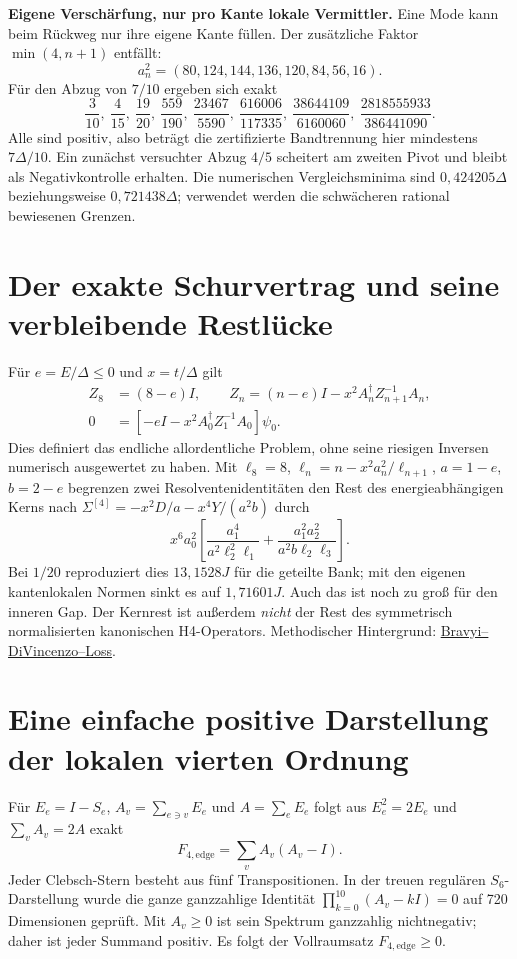 \textbf{Eigene Verschärfung, nur pro Kante lokale Vermittler.} Eine Mode kann beim Rückweg nur ihre eigene Kante füllen. Der zusätzliche Faktor $\min(4,n+1)$ entfällt:
\begin{equation}
a_n^2=(80,124,144,136,120,84,56,16).
\end{equation}
Für den Abzug von $7/10$ ergeben sich exakt
\begin{equation}
\frac3{10},\ \frac4{15},\ \frac{19}{20},\ \frac{559}{190},\
\frac{23467}{5590},\ \frac{616006}{117335},\
\frac{38644109}{6160060},\ \frac{2818555933}{386441090}.
\end{equation}
Alle sind positiv, also beträgt die zertifizierte Bandtrennung hier mindestens $7\Delta/10$. Ein zunächst versuchter Abzug $4/5$ scheitert am zweiten Pivot und bleibt als Negativkontrolle erhalten. Die numerischen Vergleichsminima sind $0{,}424205\Delta$ beziehungsweise $0{,}721438\Delta$; verwendet werden die schwächeren rational bewiesenen Grenzen.

\section{Der exakte Schurvertrag und seine verbleibende Restlücke}
Für $e=E/\Delta\le0$ und $x=t/\Delta$ gilt
\begin{align}
Z_8&=(8-e)I,\qquad Z_n=(n-e)I-x^2A_n^\dagger Z_{n+1}^{-1}A_n,\\
0&=\left[-eI-x^2A_0^\dagger Z_1^{-1}A_0\right]\psi_0.
\end{align}
Dies definiert das endliche allordentliche Problem, ohne seine riesigen Inversen numerisch ausgewertet zu haben. Mit $\ell_8=8$, $\ell_n=n-x^2a_n^2/\ell_{n+1}$, $a=1-e$, $b=2-e$ begrenzen zwei Resolventenidentitäten den Rest des energieabhängigen Kerns nach
$\Sigma^{[4]}=-x^2D/a-x^4Y/(a^2b)$ durch
\begin{equation}
x^6a_0^2\left[\frac{a_1^4}{a^2\ell_2^2\ell_1}
+\frac{a_1^2a_2^2}{a^2b\ell_2\ell_3}\right].
\end{equation}
Bei $1/20$ reproduziert dies $13{,}1528J$ für die geteilte Bank; mit den eigenen kantenlokalen Normen sinkt es auf $1{,}71601J$. Auch das ist noch zu groß für den inneren Gap. Der Kernrest ist außerdem \emph{nicht} der Rest des symmetrisch normalisierten kanonischen H4-Operators. Methodischer Hintergrund: \href{https://arxiv.org/abs/1105.0675}{Bravyi--DiVincenzo--Loss}.

\section{Eine einfache positive Darstellung der lokalen vierten Ordnung}
Für $E_e=I-S_e$, $A_v=\sum_{e\ni v}E_e$ und $A=\sum_eE_e$ folgt aus $E_e^2=2E_e$ und $\sum_vA_v=2A$ exakt
\begin{equation}\boxed{
F_{4,\mathrm{edge}}=\sum_v A_v(A_v-I).}
\end{equation}
Jeder Clebsch-Stern besteht aus fünf Transpositionen. In der treuen regulären $S_6$-Darstellung wurde die ganze ganzzahlige Identität $\prod_{k=0}^{10}(A_v-kI)=0$ auf 720 Dimensionen geprüft. Mit $A_v\ge0$ ist sein Spektrum ganzzahlig nichtnegativ; daher ist jeder Summand positiv. Es folgt der Vollraumsatz $F_{4,\mathrm{edge}}\ge0$.

